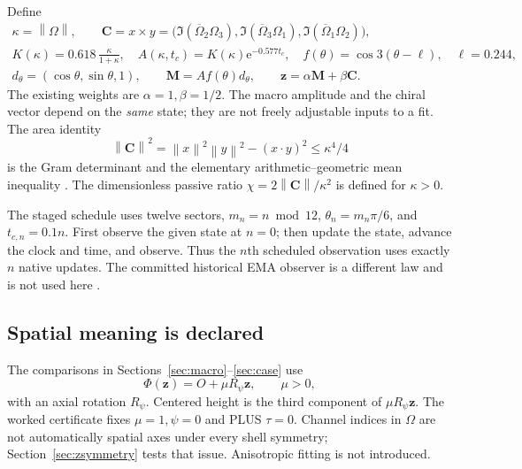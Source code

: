 \documentclass[11pt,a4paper]{article}
\numberwithin{equation}{section}
\newcommand{\e}{\mathrm e}
\newcommand{\norm}[1]{\left\lVert#1\right\rVert}
\newcommand{\zobs}{\mathbf z}
\newcommand{\macro}{\mathbf M}
\newcommand{\chiral}{\mathbf C}
\begin{document}
Define
\begin{equation}\label{eq:readouts}
\begin{gathered}
\kappa=\norm{\Omega},\qquad
\chiral=x\times y=
\bigl(\Im(\overline\Omega_2\Omega_3),
\Im(\overline\Omega_3\Omega_1),
\Im(\overline\Omega_1\Omega_2)\bigr),\\
K(\kappa)=0.618\,\frac{\kappa}{1+\kappa},\quad
A(\kappa,t_c)=K(\kappa)\e^{-0.577t_c},\quad
f(\theta)=\cos3(\theta-\ell),\quad \ell=0.244,\\
d_\theta=(\cos\theta,\sin\theta,1),\qquad
\macro=A f(\theta)d_\theta,\qquad
\zobs=\alpha\macro+\beta\chiral .
\end{gathered}
\end{equation}
The existing weights are $\alpha=1,\beta=1/2$.
The macro amplitude and the chiral vector depend on the \emph{same} state;
they are not freely adjustable inputs to a fit. The area identity
\[
\norm{\chiral}^2=\norm{x}^2\norm{y}^2-(x\cdot y)^2
\leq\kappa^4/4
\]
is the Gram determinant and the elementary arithmetic--geometric mean
inequality \cite{PaperB,Atlas4}. The dimensionless passive ratio
$\chi=2\norm{\chiral}/\kappa^2$ is defined for $\kappa>0$.

The staged schedule uses twelve sectors, $m_n=n\bmod12$,
$\theta_n=m_n\pi/6$, and $t_{c,n}=0.1n$. First observe the given state at
$n=0$; then update the state, advance the clock and time, and observe.
Thus the $n$th scheduled observation uses exactly $n$ native updates.
The committed historical EMA observer is a different law and is not used
here \cite{PaperE,Atlas6}.

\subsection{Spatial meaning is declared}
The comparisons in Sections~\ref{sec:macro}--\ref{sec:case} use
\begin{equation}\label{eq:placement}
\Phi(\zobs)=O+\mu R_\psi\zobs,\qquad \mu>0,
\end{equation}
with an axial rotation $R_\psi$. Centered height is the third component of
$\mu R_\psi\zobs$. The worked certificate fixes $\mu=1,\psi=0$ and PLUS
$\tau=0$. Channel indices in $\Omega$ are not automatically spatial axes
under every shell symmetry; Section~\ref{sec:zsymmetry} tests that issue.
Anisotropic fitting is not introduced.
\end{document}
